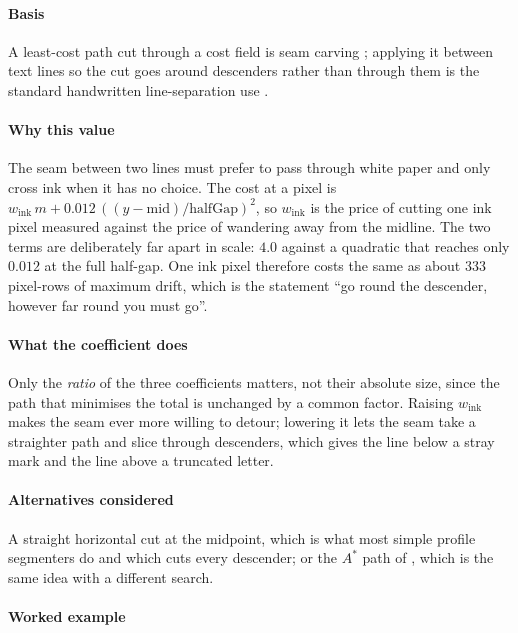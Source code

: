 \paragraph{Basis}

A least-cost path cut through a cost field is seam carving \cite[10:3]{avidan2007}; applying it between text lines so the cut goes around descenders rather than through them is the standard handwritten line-separation use \cite{arvanitopoulos2014}.

\paragraph{Why this value}

The seam between two lines must prefer to pass through white paper and only cross ink when it has no choice. The cost at a pixel is $w_{\text{ink}}\,m + 0.012\,((y-\text{mid})/\text{halfGap})^2$, so $w_{\text{ink}}$ is the price of cutting one ink pixel measured against the price of wandering away from the midline. The two terms are deliberately far apart in scale: $4.0$ against a quadratic that reaches only $0.012$ at the full half-gap. One ink pixel therefore costs the same as about $333$ pixel-rows of maximum drift, which is the statement \enquote{go round the descender, however far round you must go}.

\paragraph{What the coefficient does}

Only the \emph{ratio} of the three coefficients matters, not their absolute size, since the path that minimises the total is unchanged by a common factor. Raising $w_{\text{ink}}$ makes the seam ever more willing to detour; lowering it lets the seam take a straighter path and slice through descenders, which gives the line below a stray mark and the line above a truncated letter.

\paragraph{Alternatives considered}

A straight horizontal cut at the midpoint, which is what most simple profile segmenters do and which cuts every descender; or the $A^*$ path of \cite{arvanitopoulos2014}, which is the same idea with a different search.

\paragraph{Worked example}


